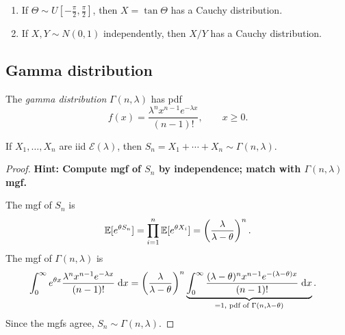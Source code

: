 \documentclass[a4paper]{article}
\begin{document}
\begin{eg}\leavevmode
  \begin{enumerate}
    \item If $\Theta \sim U[-\frac{\pi}{2}, \frac{\pi}{2}]$, then $X = \tan\Theta$ has a Cauchy distribution.
      \begin{center}
      \end{center}
    \item If $X, Y \sim N(0, 1)$ independently, then $X/Y$ has a Cauchy distribution.
  \end{enumerate}
\end{eg}

\subsection{Gamma distribution}
\begin{defi}
  The \emph{gamma distribution} $\Gamma(n, \lambda)$ has pdf
  \[
    f(x) = \frac{\lambda^n x^{n-1} e^{-\lambda x}}{(n-1)!}, \qquad x \geq 0.
  \]
\end{defi}

\begin{prop}
  If $X_1, \dotsc, X_n$ are iid $\mathcal{E}(\lambda)$, then $S_n = X_1 + \dotsb + X_n \sim \Gamma(n, \lambda)$.
\end{prop}

\begin{proof}
  \textbf{Hint: Compute mgf of $S_n$ by independence; match with $\Gamma(n, \lambda)$ mgf.}

  The mgf of $S_n$ is
  \[
    \mathbb{E}[e^{\theta S_n}] = \prod_{i=1}^n \mathbb{E}[e^{\theta X_i}] = \left(\frac{\lambda}{\lambda - \theta}\right)^n.
  \]
  The mgf of $\Gamma(n, \lambda)$ is
  \begin{align*}
    \int_0^\infty e^{\theta x} \frac{\lambda^n x^{n-1} e^{-\lambda x}}{(n-1)!}\;\mathrm{d} x
    &= \left(\frac{\lambda}{\lambda - \theta}\right)^n \underbrace{\int_0^\infty \frac{(\lambda - \theta)^n x^{n-1} e^{-(\lambda - \theta)x}}{(n-1)!}\;\mathrm{d} x}_{= 1,\text{ pdf of }\Gamma(n, \lambda - \theta)}.
  \end{align*}
  Since the mgfs agree, $S_n \sim \Gamma(n, \lambda)$.
\end{proof}
\end{document}
